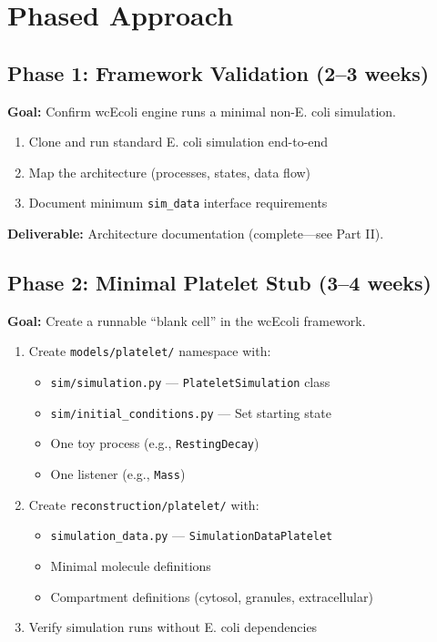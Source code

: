 \documentclass[11pt,a4paper]{report}
\begin{document}
\section{Phased Approach}

\subsection{Phase 1: Framework Validation (2--3 weeks)}

\textbf{Goal:} Confirm wcEcoli engine runs a minimal non-E. coli simulation.

\begin{enumerate}
    \item Clone and run standard E. coli simulation end-to-end
    \item Map the architecture (processes, states, data flow)
    \item Document minimum \texttt{sim\_data} interface requirements
\end{enumerate}

\textbf{Deliverable:} Architecture documentation (complete---see Part II).

\subsection{Phase 2: Minimal Platelet Stub (3--4 weeks)}

\textbf{Goal:} Create a runnable ``blank cell'' in the wcEcoli framework.

\begin{enumerate}
    \item Create \texttt{models/platelet/} namespace with:
    \begin{itemize}
        \item \texttt{sim/simulation.py} --- \texttt{PlateletSimulation} class
        \item \texttt{sim/initial\_conditions.py} --- Set starting state
        \item One toy process (e.g., \texttt{RestingDecay})
        \item One listener (e.g., \texttt{Mass})
    \end{itemize}
    \item Create \texttt{reconstruction/platelet/} with:
    \begin{itemize}
        \item \texttt{simulation\_data.py} --- \texttt{SimulationDataPlatelet}
        \item Minimal molecule definitions
        \item Compartment definitions (cytosol, granules, extracellular)
    \end{itemize}
    \item Verify simulation runs without E. coli dependencies
\end{enumerate}
\end{document}
